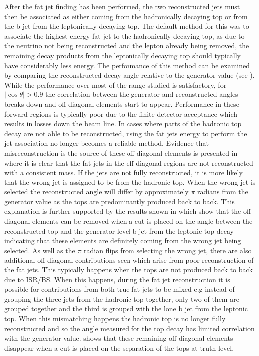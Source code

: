 After the fat jet finding has been performed, the two reconstructed jets must then be associated as either coming from the hadronically decaying top or from the b jet from the leptonically decaying top. The default method for this was to associate the highest energy fat jet to the hadronically decaying top, as due to the neutrino not being reconstructed and the lepton already being removed, the remaining decay products from the leptonically decaying top should typically have considerably less energy. The performance of this method can be examined by comparing the reconstructed decay angle relative to the generator value (see ). While the performance over most of the range studied is satisfactory, for $\mid \cos\theta \mid>0.9$ the correlation between the generator and reconstructed angles breaks down and off diagonal elements start to appear. Performance in these forward regions is typically poor due to the finite detector acceptance which results in losses down the beam line. In cases where parts of the hadronic top decay are not able to be reconstructed, using the fat jets energy to perform the jet association no longer becomes a reliable method. Evidence that misreconstruction is the source of these off diagonal elements is presented in  where it is clear that the fat jets in the off diagonal regions are not reconstructed with a consistent mass. If the jets are not fully reconstructed, it is more likely that the wrong jet is assigned to be from the hadronic top. When the wrong jet is selected the reconstructed angle will differ by approximately $\pi$ radians from the generator value as the tops are predominantly produced back to back. This explanation is further supported by the results shown in  which show that the off diagonal elements can be removed when a cut is placed on the angle between the reconstructed top and the generator level b jet from the leptonic top decay indicating that these elements are definitely coming from the wrong jet being selected. As well as the $\pi$ radian flips from selecting the wrong jet, there are also additional off diagonal contributions seen which arise from poor reconstruction of the fat jets. This typically happens when the tops are not produced back to back due to \ac{ISR}/\ac{BS}. When this happens, during the fat jet reconstruction it is possible for contributions from both true fat jets to be mixed e.g instead of grouping the three jets from the hadronic top together, only two of them are grouped together and the third is grouped with the lone b jet from the leptonic top. When this mismatching happens the hadronic top is no longer fully reconstructed and so the angle measured for the top decay has limited correlation with the generator value.  shows that these remaining off diagonal elements disappear when a cut is placed on the separation of the tops at truth level. 


